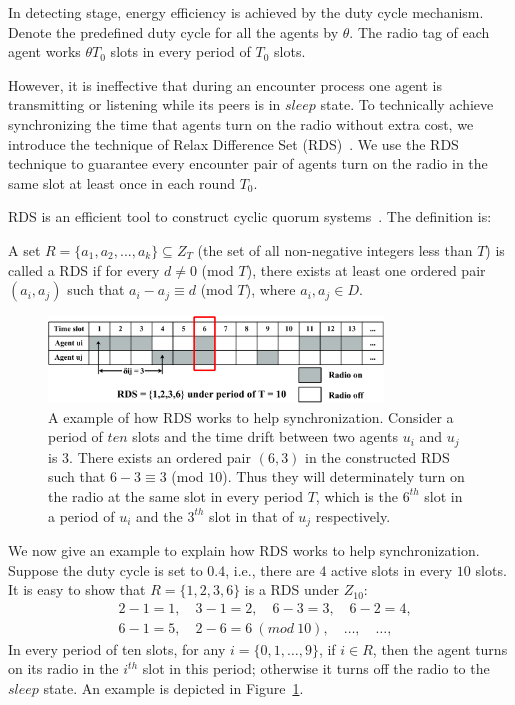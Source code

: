 In detecting stage,  
energy efficiency is achieved by the duty cycle mechanism. 
Denote the predefined duty cycle for 
all the agents by $\theta$. The radio tag of each agent works
$\theta T_0$ slots in every period of $T_0$ slots. 

However, it is ineffective that
during an encounter process one agent is transmitting
or listening while its peers is in $sleep$ state. 
To technically achieve synchronizing the time that agents turn on the radio without extra cost,
we introduce the technique of Relax Difference Set (RDS)~\cite{luk1997two}.
We use the RDS technique to guarantee every encounter pair 
of agents turn on the radio in the same slot at least once in each round $T_0$.

RDS is an efficient tool to construct cyclic quorum systems~\cite{Peleg1995The}. 
The definition is:
\begin{definition}
A set $R=\{a_1,a_2,...,a_k\} \subseteq Z_T$ (the set of all non-negative integers less than $T$)
is called a RDS if for every $d \neq 0$ (mod $T$),
there exists at least one ordered pair $(a_i,a_j)$ such that $a_i - a_j \equiv d$ (mod $T$), 
where $a_i,a_j \in D$.
\end{definition}

\begin{figure}[h]
    \centering
    \includegraphics[width=3.5in]{figures/RDS}
    \caption{A example of how RDS works to help synchronization. Consider a period
    of $ten$ slots and the time drift between two agents $u_i$ and 
    $u_j$ is $3$. There exists an ordered pair $(6,3)$ in the constructed RDS such that $6 - 3 \equiv 3$ (mod $10$). Thus 
    they will determinately turn on the radio at the same slot in every period $T$, 
    which is the $6^{th}$ slot in a period of $u_i$ and the $3^{th}$ slot in that of $u_j$ respectively.}
    \label{exampleRDS}
\end{figure}

We now give an example to explain how RDS works to help synchronization.
Suppose the duty cycle is set to $0.4$, i.e., there are $4$ active slots 
in every $10$ slots. It is easy to show that $R=\{1,2,3,6\}$ is a RDS
under $Z_{10}$:
\begin{align*}
    &2 - 1 = 1,\quad 3 - 1 = 2,\quad 6 - 3 = 3,\quad 6 - 2 = 4, \\
    &6 - 1 = 5,\quad {2 - 6 = 6}~{(mod~10)},\quad \dots,\quad \dots, 
\end{align*}
In every period of ten slots, for any $i = \{0,1,\dots,9\}$, if $i \in R$, then
the agent turns on its radio in the $i^{th}$ slot in this period; otherwise it turns off the 
radio to the $sleep$ state. An example is depicted in Figure~\ref{exampleRDS}. 

